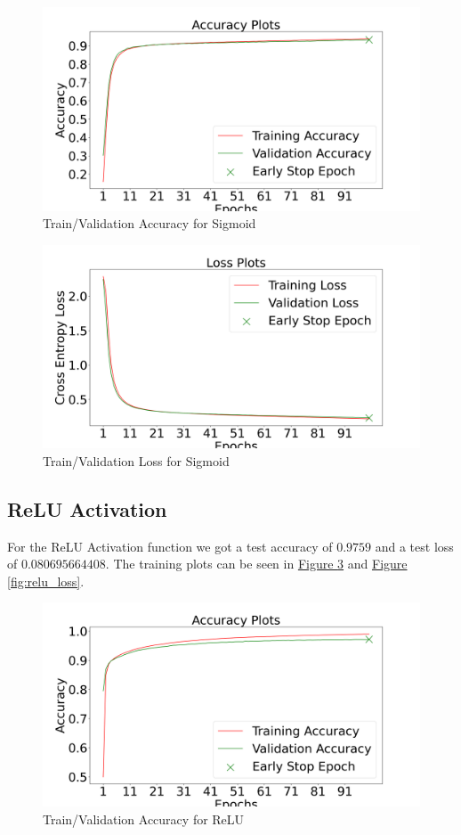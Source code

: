 \documentclass{article}
\begin{document}
\begin{figure}[h]
  \centering
  \includegraphics[width=0.8\linewidth]{include/activation-exp-acc-sigmoid.png}
  \caption{Train/Validation Accuracy for Sigmoid}
  \label{fig:sigmoid_acc}
\end{figure}

\begin{figure}[h]
  \centering
  \includegraphics[width=0.8\linewidth]{include/activation-exp-loss-sigmoid.png}
  \caption{Train/Validation Loss for Sigmoid}
  \label{fig:sigmoid_loss}
\end{figure}

\subsection{ReLU Activation}
For the ReLU Activation function we got a test accuracy of $0.9759$ and 
a test loss of $0.080695664408$. The training plots can be seen in
\hyperref[fig:relu_acc]{Figure \ref{fig:relu_acc}} and
\hyperref[fig:relu_loss]{Figure \ref{fig:relu_loss}}.


\begin{figure}[h]
  \centering
  \includegraphics[width=0.8\linewidth]{include/activation-exp-acc-relu.png}
  \caption{Train/Validation Accuracy for ReLU}
  \label{fig:relu_acc}
\end{figure}
\end{document}

